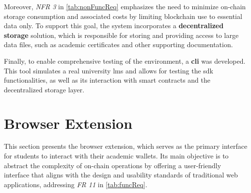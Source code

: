 Moreover, \textit{NFR 3} in \cref{tab:nonFuncReq} emphasizes the need to minimize on-chain storage consumption and associated costs by limiting blockchain use to essential data only. To support this goal, the system incorporates a \textbf{decentralized storage} solution, which is responsible for storing and providing access to large data files, such as academic certificates and other supporting documentation.

Finally, to enable comprehensive testing of the environment, a \textbf{\acrlong{cli}} was developed. This tool simulates a real university \acrshort{lms} and allows for testing the \acrshort{sdk} functionalities, as well as its interaction with smart contracts and the decentralized storage layer.

 \section{Browser Extension}
\label{sec:browserExtensionDesign}
This section presents the browser extension, which serves as the primary interface for students to interact with their academic wallets. Its main objective is to abstract the complexity of on-chain operations by offering a user-friendly interface that aligns with the design and usability standards of traditional web applications, addressing \textit{FR 11} in \cref{tab:funcReq}.

